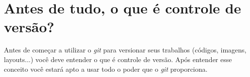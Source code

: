 \documentclass[12pt,openright,oneside,a4paper,english,brazil]{abntex2}
\renewcommand{\listtablename}{Lista de Tabelas}
\begin{document}
	\frenchspacing 		%
	
	\imprimircapa
	\imprimirfolhaderosto*
	
	
	\listoffigures*
	\cleardoublepage
	
	
%	
%	
%	
	
	\tableofcontents*
	\cleardoublepage

\textual
	
	\chapter[Antes de tudo, o que é controle de versão?]{Antes de tudo, o que é controle de versão?} %
Antes de começar a utilizar o \textit{git} para versionar seus trabalhos (códigos, imagens, layouts...) você deve entender o que é controle de versão. Após entender esse conceito você estará apto a usar todo o poder que o \textit{git} proporciona. 
\end{document}
